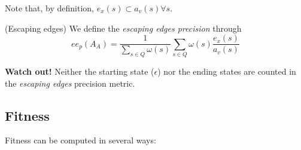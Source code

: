 \documentclass[a4paper]{report}
\begin{document}
Note that, by definition, $e_x(s) \subset a_v(s) \forall s$.

\begin{definition}
    (Escaping edges) We define the \emph{escaping edges precision} through \[
    ee_p(A_A) = \frac{1}{\sum_{s \in Q} \omega(s)}\sum_{s \in Q} \omega(s) \frac{e_x(s)}{a_v(s)}
    \] 
\end{definition}

\begin{note}
    \textbf{Watch out!} Neither the starting state ($\epsilon$) nor the ending states are counted in the \emph{escaping edges} precision metric.
\end{note}

\subsection*{Fitness}

Fitness can be computed in several ways:
\end{document}
